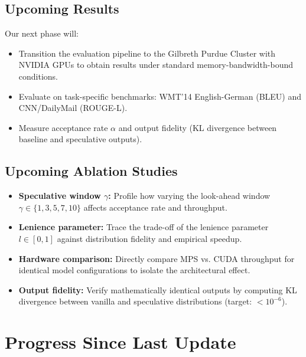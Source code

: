 \documentclass[11pt]{article}
\begin{document}
\subsection{Upcoming Results}
Our next phase will:
\begin{itemize}
    \item Transition the evaluation pipeline to the Gilbreth Purdue Cluster with NVIDIA GPUs to obtain results under standard memory-bandwidth-bound conditions.
    \item Evaluate on task-specific benchmarks: WMT'14 English-German (BLEU) and CNN/DailyMail (ROUGE-L).
    \item Measure acceptance rate $\alpha$ and output fidelity (KL divergence between baseline and speculative outputs).
\end{itemize}

\subsection{Upcoming Ablation Studies}
\begin{itemize}
    \item \textbf{Speculative window $\gamma$:} Profile how varying the look-ahead window $\gamma \in \{1, 3, 5, 7, 10\}$ affects acceptance rate and throughput.
    \item \textbf{Lenience parameter:} Trace the trade-off of the lenience parameter $l \in [0, 1]$ against distribution fidelity and empirical speedup.
    \item \textbf{Hardware comparison:} Directly compare MPS vs. CUDA throughput for identical model configurations to isolate the architectural effect.
    \item \textbf{Output fidelity:} Verify mathematically identical outputs by computing KL divergence between vanilla and speculative distributions (target: $< 10^{-6}$).
\end{itemize}

\section{Progress Since Last Update}
\end{document}
